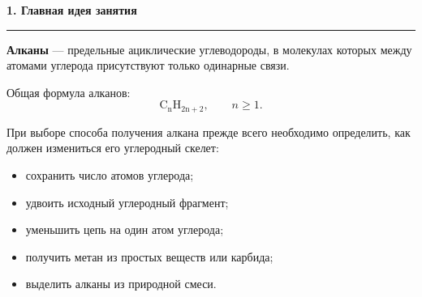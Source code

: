 \documentclass[a4paper,12pt]{article}
\newcommand{\sectiontitle}[1]{%
    \vspace{0.9em}%
    {\Large\bfseries\color{darkaccent}#1\par}%
    \vspace{0.2em}%
    {\color{accent}\rule{\linewidth}{0.8pt}}%
    \vspace{0.45em}%
}
\begin{document}
\sectiontitle{1. Главная идея занятия}

\textbf{Алканы} --- предельные ациклические углеводороды, в молекулах которых
между атомами углерода присутствуют только одинарные связи.

Общая формула алканов:
\[
    \mathrm{C_nH_{2n+2}}, \qquad n\geq 1.
\]

При выборе способа получения алкана прежде всего необходимо определить,
как должен измениться его углеродный скелет:

\begin{itemize}
    \item сохранить число атомов углерода;
    \item удвоить исходный углеродный фрагмент;
    \item уменьшить цепь на один атом углерода;
    \item получить метан из простых веществ или карбида;
    \item выделить алканы из природной смеси.
\end{itemize}
\end{document}
